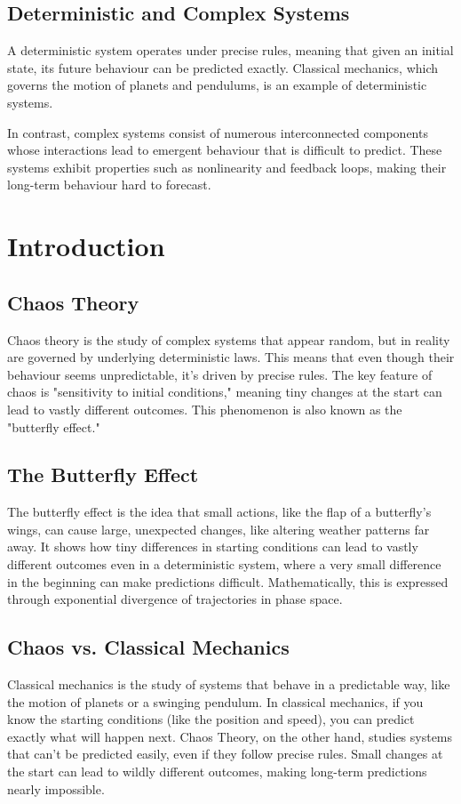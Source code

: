 \documentclass[12pt]{article}
\begin{document}
\subsection{Deterministic and Complex Systems}
A deterministic system operates under precise rules, meaning that given an initial state, its future behaviour can be predicted exactly. Classical mechanics, which governs the motion of planets and pendulums, is an example of deterministic systems.

In contrast, complex systems consist of numerous interconnected components whose interactions lead to emergent behaviour that is difficult to predict. These systems exhibit properties such as nonlinearity and feedback loops, making their long-term behaviour hard to forecast.

\section{Introduction}


\subsection{Chaos Theory}
Chaos theory is the study of complex systems that appear random, but in reality are governed by underlying deterministic laws. This means that even though their behaviour seems unpredictable, it's driven by precise rules. The key feature of chaos is "sensitivity to initial conditions," meaning tiny changes at the start can lead to vastly different outcomes. This phenomenon is also known as the "butterfly effect."

\subsection{The Butterfly Effect}
The butterfly effect is the idea that small actions, like the flap of a butterfly’s wings, can cause large, unexpected changes, like altering weather patterns far away. It shows how tiny differences in starting conditions can lead to vastly different outcomes even in a deterministic system, where a very small difference in the beginning can make predictions difficult. Mathematically, this is expressed through exponential divergence of trajectories in phase space.

\subsection{Chaos vs. Classical Mechanics}
Classical mechanics is the study of systems that behave in a predictable way, like the motion of planets or a swinging pendulum. In classical mechanics, if you know the starting conditions (like the position and speed), you can predict exactly what will happen next. Chaos Theory, on the other hand, studies systems that can’t be predicted easily, even if they follow precise rules. Small changes at the start can lead to wildly different outcomes, making long-term predictions nearly impossible.
\end{document}
